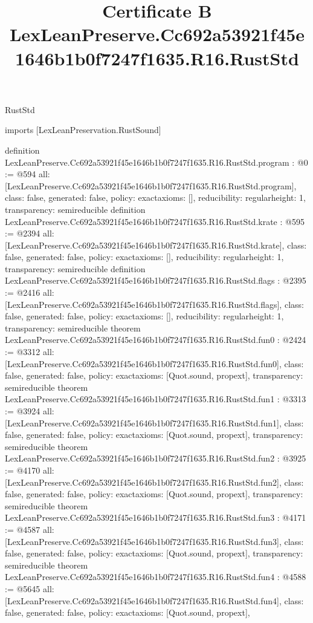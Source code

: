 \begin{lexlean}{RustStd}
\title{Certificate B LexLeanPreserve.Cc692a53921f45e1646b1b0f7247f1635.R16.RustStd}
\begin{coremodule}
imports [LexLeanPreservation.RustSound]

definition LexLeanPreserve.Cc692a53921f45e1646b1b0f7247f1635.R16.RustStd.program : @0 := @594 {
  all: [LexLeanPreserve.Cc692a53921f45e1646b1b0f7247f1635.R16.RustStd.program],
  class: false,
  generated: false,
  policy: exact{axioms: []},
  reducibility: regular{height: 1},
  transparency: semireducible
}
definition LexLeanPreserve.Cc692a53921f45e1646b1b0f7247f1635.R16.RustStd.krate : @595 := @2394 {
  all: [LexLeanPreserve.Cc692a53921f45e1646b1b0f7247f1635.R16.RustStd.krate],
  class: false,
  generated: false,
  policy: exact{axioms: []},
  reducibility: regular{height: 1},
  transparency: semireducible
}
definition LexLeanPreserve.Cc692a53921f45e1646b1b0f7247f1635.R16.RustStd.flags : @2395 := @2416 {
  all: [LexLeanPreserve.Cc692a53921f45e1646b1b0f7247f1635.R16.RustStd.flags],
  class: false,
  generated: false,
  policy: exact{axioms: []},
  reducibility: regular{height: 1},
  transparency: semireducible
}
theorem LexLeanPreserve.Cc692a53921f45e1646b1b0f7247f1635.R16.RustStd.fun0 : @2424 := @3312 {
  all: [LexLeanPreserve.Cc692a53921f45e1646b1b0f7247f1635.R16.RustStd.fun0],
  class: false,
  generated: false,
  policy: exact{axioms: [Quot.sound, propext]},
  transparency: semireducible
}
theorem LexLeanPreserve.Cc692a53921f45e1646b1b0f7247f1635.R16.RustStd.fun1 : @3313 := @3924 {
  all: [LexLeanPreserve.Cc692a53921f45e1646b1b0f7247f1635.R16.RustStd.fun1],
  class: false,
  generated: false,
  policy: exact{axioms: [Quot.sound, propext]},
  transparency: semireducible
}
theorem LexLeanPreserve.Cc692a53921f45e1646b1b0f7247f1635.R16.RustStd.fun2 : @3925 := @4170 {
  all: [LexLeanPreserve.Cc692a53921f45e1646b1b0f7247f1635.R16.RustStd.fun2],
  class: false,
  generated: false,
  policy: exact{axioms: [Quot.sound, propext]},
  transparency: semireducible
}
theorem LexLeanPreserve.Cc692a53921f45e1646b1b0f7247f1635.R16.RustStd.fun3 : @4171 := @4587 {
  all: [LexLeanPreserve.Cc692a53921f45e1646b1b0f7247f1635.R16.RustStd.fun3],
  class: false,
  generated: false,
  policy: exact{axioms: [Quot.sound, propext]},
  transparency: semireducible
}
theorem LexLeanPreserve.Cc692a53921f45e1646b1b0f7247f1635.R16.RustStd.fun4 : @4588 := @5645 {
  all: [LexLeanPreserve.Cc692a53921f45e1646b1b0f7247f1635.R16.RustStd.fun4],
  class: false,
  generated: false,
  policy: exact{axioms: [Quot.sound, propext]},
}
\end{coremodule}
\end{lexlean}
